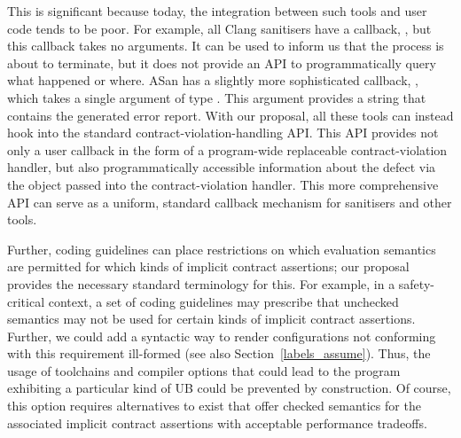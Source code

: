 {This is significant because today, the integration between such tools and user code tends to be poor. For example, all Clang sanitisers have a callback, , but this callback takes no arguments. It can be used to inform us that the process is about to terminate, but it does not provide an API to programmatically query what happened or where. ASan has a slightly more sophisticated callback, , which takes a single argument of type . This argument provides a string that contains the generated error report. With our proposal, all these tools can instead hook into the standard contract-violation-handling API. This API provides not only a user callback in the form of a  program-wide replaceable contract-violation handler, but also programmatically accessible information about the defect via the  \mbox{} object passed into the contract-violation handler. This more comprehensive API can serve as a uniform, standard callback mechanism for sanitisers and other tools.

Further, coding guidelines can place restrictions on which evaluation semantics are permitted for which kinds of implicit contract assertions; our proposal provides the necessary standard terminology for this. For example, in a safety-critical context, a set of coding guidelines may prescribe that unchecked semantics may not be used for certain kinds of implicit contract assertions. Further, we could add a syntactic way to render configurations not conforming with this requirement ill-formed (see also Section~\ref{labels_assume}). Thus, the usage of toolchains and compiler options that could lead to the program exhibiting a particular kind of UB could be prevented by construction. Of course, this option requires alternatives to exist that offer checked semantics for the associated implicit contract assertions with acceptable performance tradeoffs.

}
